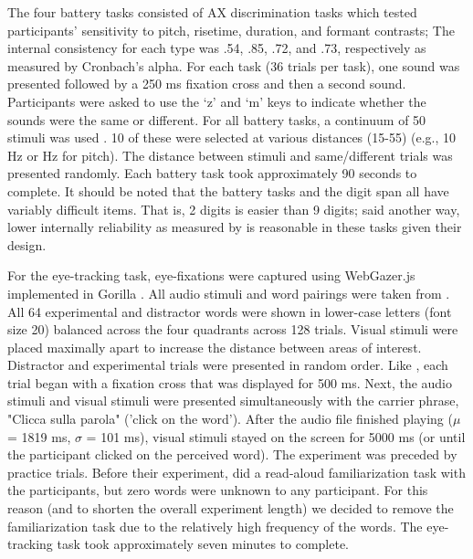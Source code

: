 The four battery tasks consisted of AX discrimination tasks which tested participants' sensitivity to pitch, risetime, duration, and formant contrasts; The internal consistency for each type was .54, .85, .72, and .73, respectively as measured by Cronbach's alpha. For each task (36 trials per task), one sound was presented followed by a 250 ms fixation cross and then a second sound. Participants were asked to use the `z' and `m' keys to indicate whether the sounds were the same or different. For all battery tasks, a continuum of 50 stimuli was used \citep{Kachlicka_Saito_Tierney_2019}. 10 of these were selected at various distances (15-55) (e.g., 10 Hz or Hz for pitch). The distance between stimuli and same/different trials was presented randomly. Each battery task took approximately 90 seconds to complete. It should be noted that the battery tasks and the digit span all have variably difficult items. That is, 2 digits is easier than 9 digits; said another way, lower internally reliability as measured by \citep{Cronbach1951} is reasonable in these tasks given their design. 

For the eye-tracking task, eye-fixations were captured using WebGazer.js \citep{Papoutsaki} implemented in Gorilla \citep{Anwyl-Irvine_2019}. All audio stimuli and word pairings were taken from \cite{Sulpizio_McQueen_2012}. All 64 experimental and distractor words were shown in lower-case letters (font size 20) balanced across the four quadrants across 128 trials. Visual stimuli were placed maximally apart to increase the distance between areas of interest. Distractor and experimental trials were presented in random order. Like \cite{Sulpizio_McQueen_2012}, each trial began with a fixation cross that was displayed for 500 ms. Next, the audio stimuli and visual stimuli were presented simultaneously with the carrier phrase, "Clicca sulla parola" ('click on the word'). After the audio file finished playing ($\mu$ = 1819 ms, $\sigma$ = 101 ms), visual stimuli stayed on the screen for 5000 ms (or until the participant clicked on the perceived word). The experiment was preceded by practice trials. Before their experiment, \cite{Sulpizio_McQueen_2012} did a read-aloud familiarization task with the participants, but zero words were unknown to any participant. For this reason (and to shorten the overall experiment length) we decided to remove the familiarization task due to the relatively high frequency of the words. The eye-tracking task took approximately seven minutes to complete.

